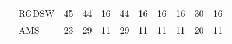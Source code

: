 \begin{table}[H]
\begin{tabular}{llrrrrrrrrr}
\cline{2-11}
\bfseries  & RGDSW & 45 & {\cellcolor[HTML]{405FE5}} \color[HTML]{F1F1F1} 44 & 16 & {\cellcolor[HTML]{405FE5}} \color[HTML]{F1F1F1} 44 & 16 & {\cellcolor[HTML]{E2E4FB}} \color[HTML]{000000} 16 & 16 & {\cellcolor[HTML]{91A1F0}} \color[HTML]{F1F1F1} 30 & 16 \\
\cline{2-11}
\bfseries  & AMS & 23 & {\cellcolor[HTML]{91A1F0}} \color[HTML]{F1F1F1} 29 & 11 & {\cellcolor[HTML]{91A1F0}} \color[HTML]{F1F1F1} 29 & 11 & {\cellcolor[HTML]{E2E4FB}} \color[HTML]{000000} 11 & 11 & {\cellcolor[HTML]{405FE5}} \color[HTML]{F1F1F1} 20 & 11 \\
\cline{1-11} \cline{2-11}
\bottomrule
\end{tabular}
\end{table}
